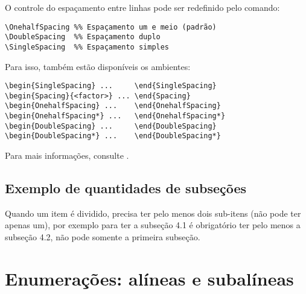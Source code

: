 O controle do espaçamento entre linhas pode ser redefinido pelo comando:

\begin{SingleSpacing}%
    \begin{verbatim}
\OnehalfSpacing %% Espaçamento um e meio (padrão)
\DoubleSpacing  %% Espaçamento duplo
\SingleSpacing  %% Espaçamento simples
\end{verbatim}
\end{SingleSpacing}

Para isso, também estão disponíveis os ambientes:

\begin{SingleSpacing}%
    \begin{verbatim}
\begin{SingleSpacing} ...     \end{SingleSpacing}
\begin{Spacing}{<factor>} ... \end{Spacing}
\begin{OnehalfSpacing} ...    \end{OnehalfSpacing}
\begin{OnehalfSpacing*} ...   \end{OnehalfSpacing*}
\begin{DoubleSpacing} ...     \end{DoubleSpacing}
\begin{DoubleSpacing*} ...    \end{DoubleSpacing*}
\end{verbatim}
\end{SingleSpacing}

Para mais informações, consulte .

\subsection{Exemplo de quantidades de subseções}\label{sec:exSubsec}

Quando um item é dividido, precisa ter pelo menos dois sub-itens (não pode ter apenas um), por exemplo para ter a subseção 4.1 é obrigatório ter pelo menos a subseção 4.2, não pode somente a primeira subseção.

\section{Enumerações: alíneas e subalíneas}\label{sec:enumeracoes}

